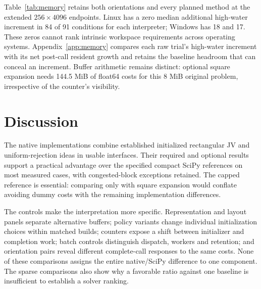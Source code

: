 \documentclass[11pt,a4paper]{article}
\begin{document}
Table~\ref{tab:memory} retains both orientations and every planned method at the extended $256\times4096$ endpoints. Linux has a zero median additional high-water increment in 84 of 91 conditions for each interpreter; Windows has 18 and 17. These zeros cannot rank intrinsic workspace requirements across operating systems. Appendix~\ref{app:memory} compares each raw trial's high-water increment with its net post-call resident growth and retains the baseline headroom that can conceal an increment. Buffer arithmetic remains distinct: optional square expansion needs 144.5 MiB of float64 costs for this 8 MiB original problem, irrespective of the counter's visibility.

\begin{table}[!htbp]
\centering
\caption{Extended memory endpoints in MiB, median [minimum, maximum] over five fresh processes. Linux and Windows counter groups remain separate. A zero high-water increment means no increase above an earlier process peak, not zero allocation. Cost MiB is the arithmetic size of one binary64 representation, not additional allocation; native calls can borrow or internally orient the input. The companion export retains condition-specific headroom. R/O denote required/optional; $0^*$ means no new high-water peak.}
\label{tab:memory}
\begingroup\footnotesize
\setlength{\tabcolsep}{3pt}
\renewcommand{\arraystretch}{1.12}

\endgroup
\end{table}
\FloatBarrier
\section{Discussion}

The native implementations combine established initialized rectangular JV and uniform-rejection ideas in usable interfaces. Their required and optional results support a practical advantage over the specified compact SciPy references on most measured cases, with congested-block exceptions retained. The capped reference is essential: comparing only with square expansion would conflate avoiding dummy costs with the remaining implementation differences.

The controls make the interpretation more specific. Representation and layout panels separate alternative buffers; policy variants change individual initialization choices within matched builds; counters expose a shift between initializer and completion work; batch controls distinguish dispatch, workers and retention; and orientation pairs reveal different complete-call responses to the same costs. None of these comparisons assigns the entire native/SciPy difference to one component. The sparse comparisons also show why a favorable ratio against one baseline is insufficient to establish a solver ranking.
\end{document}
